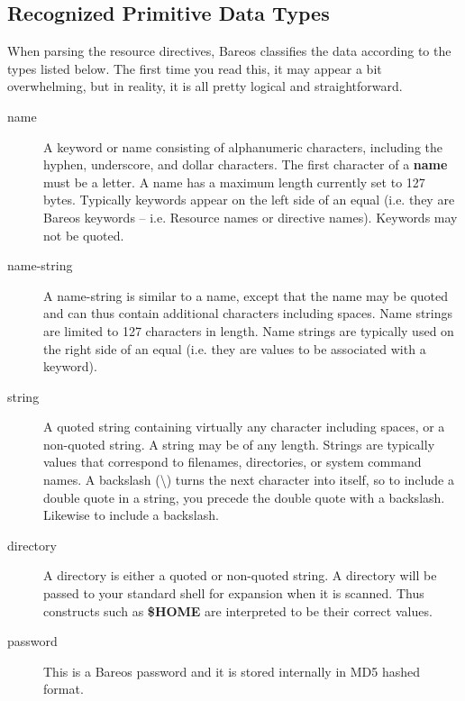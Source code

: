 \subsection{Recognized Primitive Data Types}
\label{DataTypes}

When parsing the resource directives, Bareos classifies the data according to
the types listed below. The first time you read this, it may appear a bit
overwhelming, but in reality, it is all pretty logical and straightforward.

\begin{description}

\item [name]
   A keyword or name consisting of alphanumeric characters, including the
hyphen, underscore, and dollar  characters. The first character of a {\bf
name} must be  a letter.  A name has a maximum length currently set to 127
bytes.  Typically keywords appear on the left side of an equal (i.e.  they are
Bareos keywords -- i.e. Resource names or  directive names). Keywords may not
be quoted.

\item [name-string]
   A name-string is similar to a name,  except that the name may be quoted and
can thus contain  additional characters including spaces. Name strings  are
limited to 127 characters in length. Name strings  are typically used on the
right side of an equal (i.e.  they are values to be associated with a keyword).


\item [string]
   A quoted string containing virtually any  character including spaces, or a
non-quoted string. A  string may be of any length. Strings are typically
values  that correspond to filenames, directories, or system  command names. A
backslash (\textbackslash{}) turns the next character into  itself, so to
include a double quote in a string, you precede the  double quote with a
backslash. Likewise to include a backslash.

\item [directory]
   A directory is either a quoted or  non-quoted string. A directory will be
passed to your  standard shell for expansion when it is scanned. Thus
constructs such as {\bf \$HOME} are interpreted to be  their correct values.

\item [password]
   This is a Bareos password and it is stored internally in MD5 hashed format.


\end{description}
